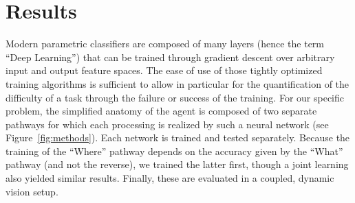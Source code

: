 \section*{Results}
\label{sec:results}

Modern parametric classifiers are composed of many layers (hence the term ``Deep Learning'') that can be trained through gradient descent over arbitrary input and output feature spaces. The ease of use of those tightly optimized training algorithms is sufficient to allow in particular for the quantification of the difficulty of a task through the failure or success of the training.
For our specific problem, the simplified anatomy of the agent is composed of two separate pathways for which each processing is realized by such a neural network (see Figure~\ref{fig:methods}). Each network is trained and tested separately. Because the training of the ``Where'' pathway depends on the accuracy given by the ``What'' pathway (and not the reverse), we trained the latter first, though a joint learning also yielded similar results. %
Finally, these are evaluated in a coupled, dynamic vision setup.

